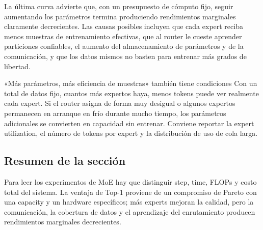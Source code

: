 
La última curva advierte que, con un presupuesto de cómputo fijo, seguir aumentando los parámetros termina produciendo rendimientos marginales claramente decrecientes. Las causas posibles incluyen que cada expert reciba menos muestras de entrenamiento efectivas, que al router le cueste aprender particiones confiables, el aumento del almacenamiento de parámetros y de la comunicación, y que los datos mismos no basten para entrenar más grados de libertad.


\begin{warningbox}{«Más parámetros, más eficiencia de muestras» también tiene condiciones}
Con un total de datos fijo, cuantos más expertos haya, menos tokens puede ver realmente cada expert. Si el router asigna de forma muy desigual o algunos expertos permanecen en arranque en frío durante mucho tiempo, los parámetros adicionales se convierten en capacidad sin entrenar. Conviene reportar la expert utilization, el número de tokens por expert y la distribución de uso de cola larga.
\end{warningbox}

\subsection{Resumen de la sección}

Para leer los experimentos de MoE hay que distinguir step, time, FLOPs y costo total del sistema. La ventaja de Top-1 proviene de un compromiso de Pareto con una capacity y un hardware específicos; más experts mejoran la calidad, pero la comunicación, la cobertura de datos y el aprendizaje del enrutamiento producen rendimientos marginales decrecientes.

